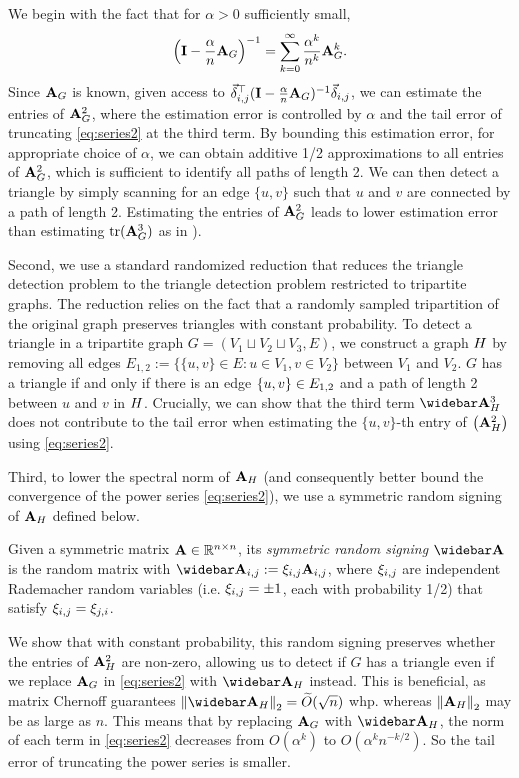 We begin with the fact that for $\alpha>0$ sufficiently small, 
\begin{align}\label{eq:series2}
    \left(\mathbf{I} - \frac{\alpha}{n}\mathbf{A}_G\right)^{-1} = \sum_{k=0}^\infty \frac{\alpha^k}{n^k} \mathbf{A}_G^k. 
\end{align}
Since $\mathbf{A}_G$ is known, given access to $\vec{\delta}_{i,j}^\top (\mathbf{I} - \frac{\alpha}{n}\mathbf{A}_G)^{-1} \vec{\delta}_{i,j}$, we can estimate the entries of $\mathbf{A}_G^2$, where the estimation error is controlled by $\alpha$ and the tail error of truncating \eqref{eq:series2} at the third term. By bounding this estimation error, for appropriate choice of $\alpha$, we can obtain additive 1/2 approximations to all entries of $\mathbf{A}_G^2$, which is sufficient to identify all paths of length 2. We can then detect a triangle by simply scanning for an edge $\{u, v\}$ such that $u$ and $v$ are connected by a path of length 2. Estimating the entries of $\mathbf{A}_G^2$ leads to lower estimation error than estimating $\mathrm{tr}(\mathbf{A}_G^3)$ as in \cite{musco2017spectrum}). 


Second, we use a standard randomized reduction that reduces the triangle detection problem to the triangle detection problem restricted to tripartite graphs. The reduction relies on the fact that a randomly sampled tripartition of the original graph preserves triangles with constant probability. To detect a triangle in a tripartite graph $G = (V_1 \sqcup V_2 \sqcup V_3, E)$, we construct a graph $H$ by removing all edges $E_{1,2} := \{\{u, v\} \in E : u \in V_1, v \in V_2\}$ between $V_1$ and $V_2$. $G$ has a triangle if and only if there is an edge $\left\{ u,v \right\} \in E_{1,2}$ and a path of length 2 between $u$ and $v$ in $H$. Crucially, we can show that the third term $\As_{\Gprime}^3$ does not contribute to the tail error when estimating the $\{u, v\}$-th entry of $\left( \mathbf{A}_{H}^2 \right)$ using \eqref{eq:series2}. 


Third, to lower the spectral norm of $\mathbf{A}_{H}$ (and consequently better bound the convergence of the power series \eqref{eq:series2}), we use a symmetric random signing of $\mathbf{A}_{H}$ defined below.
\begin{definition}
    Given a symmetric matrix $\mathbf{A} \in \mathbb{R}^{n \times n}$, its \emph{symmetric random signing} $\As$ is the random matrix with $\As_{i, j} := \rad_{i,j} \A_{i,j}$, where $\xi_{i,j}$ are independent Rademacher random variables (i.e. $\xi_{i,j} = \pm1$, each with probability 1/2) that satisfy $\xi_{i,j} = \xi_{j,i}$.
\end{definition}
We show that with constant probability, this random signing preserves whether the entries of $\mathbf{A}_{H}^2$ are non-zero, allowing us to detect if $G$ has a triangle even if we replace $\mathbf{A}_G$ in \eqref{eq:series2} with $\As_{\Gprime}$ instead. This is beneficial, as matrix Chernoff guarantees $\Norm{\As_{\Gprime}}_2 = \Otilde{\sqrt{n}}$ whp. whereas $\left\Vert \mathbf{A}_{H} \right\Vert_2$ may be as large as $n$. This means that by replacing $\mathbf{A}_G$ with $\As_{\Gprime}$, the norm of each term in \eqref{eq:series2} decreases from $O(\alpha^k)$ to $O(\alpha^k n^{-k/2})$. So the tail error of truncating the power series is smaller. 

